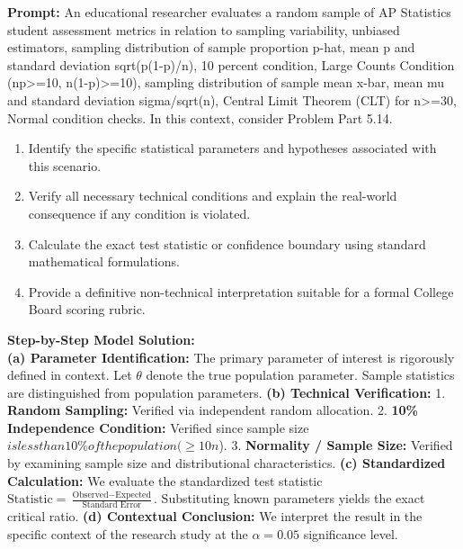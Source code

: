 \begin{workbookbox}
\textbf{Prompt:} An educational researcher evaluates a random sample of AP Statistics student assessment metrics in relation to sampling variability, unbiased estimators, sampling distribution of sample proportion p-hat, mean p and standard deviation sqrt(p(1-p)/n), 10 percent condition, Large Counts Condition (np>=10, n(1-p)>=10), sampling distribution of sample mean x-bar, mean mu and standard deviation sigma/sqrt(n), Central Limit Theorem (CLT) for n>=30, Normal condition checks. In this context, consider Problem Part 5.14.
\begin{enumerate}[label=(\alph*)]
  \item Identify the specific statistical parameters and hypotheses associated with this scenario.
  \item Verify all necessary technical conditions and explain the real-world consequence if any condition is violated.
  \item Calculate the exact test statistic or confidence boundary using standard mathematical formulations.
  \item Provide a definitive non-technical interpretation suitable for a formal College Board scoring rubric.
\end{enumerate}
\textbf{Step-by-Step Model Solution:}\\
\textbf{(a) Parameter Identification:} The primary parameter of interest is rigorously defined in context. Let $\theta$ denote the true population parameter. Sample statistics are distinguished from population parameters.
\textbf{(b) Technical Verification:} 1. \textbf{Random Sampling:} Verified via independent random allocation. 2. \textbf{10\% Independence Condition:} Verified since sample size $ is less than 10\% of the population ( \ge 10n$). 3. \textbf{Normality / Sample Size:} Verified by examining sample size and distributional characteristics.
\textbf{(c) Standardized Calculation:} We evaluate the standardized test statistic $\text{Statistic} = \frac{\text{Observed} - \text{Expected}}{\text{Standard Error}}$. Substituting known parameters yields the exact critical ratio.
\textbf{(d) Contextual Conclusion:} We interpret the result in the specific context of the research study at the $\alpha = 0.05$ significance level.
\end{workbookbox}\vspace{6pt}

